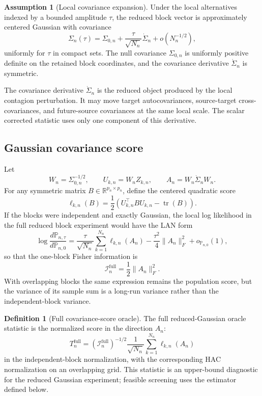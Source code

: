 \documentclass[11pt,a4paper]{amsart}
\theoremstyle{plain}
\theoremstyle{definition}
\newtheorem{definition}[theorem]{Definition}
\newtheorem{assumption}[theorem]{Assumption}
\theoremstyle{remark}
\DeclareMathOperator{\tr}{tr}
\newcommand{\R}{\mathbb{R}}
\newcommand{\PP}{\mathbb{P}}
\newcommand{\scrI}{\mathcal{I}}
\begin{document}
\begin{assumption}[Local covariance expansion]\label{ass:cov-expansion}
Under the local alternatives indexed by a bounded amplitude \(\tau\), the reduced block vector is
approximately centered Gaussian with covariance
\[
        \Sigma_n(\tau)
        =
        \Sigma_{0,n}
        +
        \frac{\tau}{\sqrt{N_n}}\dot\Sigma_n
        +
        o(N_n^{-1/2}),
\]
uniformly for \(\tau\) in compact sets.  The null covariance \(\Sigma_{0,n}\) is uniformly positive
definite on the retained block coordinates, and the covariance derivative \(\dot\Sigma_n\) is
symmetric.
\end{assumption}

The covariance derivative \(\dot\Sigma_n\) is the reduced object produced by the local contagion
perturbation.  It may move target autocovariances, source-target cross-covariances, and
future-source covariances at the same local scale.  The scalar corrected statistic uses only one
component of this derivative.

\subsection{Gaussian covariance score}

Let
\[
        W_n=\Sigma_{0,n}^{-1/2},
        \qquad
        U_{k,n}=W_n Z_{k,n},
        \qquad
        A_n=W_n\dot\Sigma_n W_n.
\]
For any symmetric matrix \(B\in\R^{p_n\times p_n}\), define the centered quadratic score
\[
        \ell_{k,n}(B)
        =
        \frac12
        \left(
        U_{k,n}^{\top}BU_{k,n}
        -
        \tr(B)
        \right).
\]
If the blocks were independent and exactly Gaussian, the local log likelihood in the full reduced
block experiment would have the LAN form
\[
        \log\frac{d\PP_{n,\tau}}{d\PP_{n,0}}
        =
        \frac{\tau}{\sqrt{N_n}}\sum_{k=1}^{N_n}\ell_{k,n}(A_n)
        -
        \frac{\tau^2}{4}\|A_n\|_F^2
        +o_{\PP_{n,0}}(1),
\]
so that the one-block Fisher information is
\[
        \scrI_n^{\mathrm{full}}
        =
        \frac12\|A_n\|_F^2.
\]
With overlapping blocks the same expression remains the population score, but the variance of its
sample sum is a long-run variance rather than the independent-block variance.

\begin{definition}[Full covariance-score oracle]
The full reduced-Gaussian oracle statistic is the normalized score in the direction \(A_n\):
\[
        T_n^{\mathrm{full}}
        =
        (\scrI_n^{\mathrm{full}})^{-1/2}
        \frac1{\sqrt{N_n}}\sum_{k=1}^{N_n}\ell_{k,n}(A_n)
\]
in the independent-block normalization, with the corresponding HAC normalization on an overlapping
grid.  This statistic is an upper-bound diagnostic for the reduced Gaussian experiment; feasible
screening uses the estimator defined below.
\end{definition}
\end{document}
